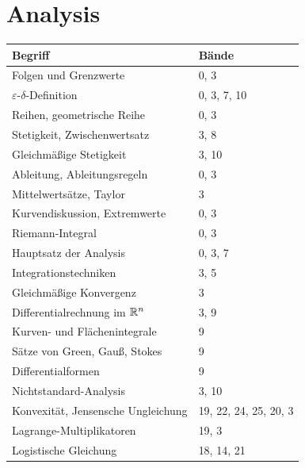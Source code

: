 \section*{Analysis}
\nopagebreak
{\small\renewcommand{\arraystretch}{1.32}
\begin{longtable}{@{}P{5.6cm}P{2.8cm}@{}}
\toprule
\textbf{Begriff} & \textbf{Bände}\\
\midrule
\endhead
Folgen und Grenzwerte & 0, 3\\
$\varepsilon$-$\delta$-Definition & 0, 3, 7, 10\\
Reihen, geometrische Reihe & 0, 3\\
Stetigkeit, Zwischenwertsatz & 3, 8\\
Gleichmäßige Stetigkeit & 3, 10\\
Ableitung, Ableitungsregeln & 0, 3\\
Mittelwertsätze, Taylor & 3\\
Kurvendiskussion, Extremwerte & 0, 3\\
Riemann-Integral & 0, 3\\
Hauptsatz der Analysis & 0, 3, 7\\
Integrationstechniken & 3, 5\\
Gleichmäßige Konvergenz & 3\\
Differentialrechnung im $\mathbb{R}^{n}$ & 3, 9\\
Kurven- und Flächenintegrale & 9\\
Sätze von Green, Gauß, Stokes & 9\\
Differentialformen & 9\\
Nichtstandard-Analysis & 3, 10\\
Konvexität, Jensensche Ungleichung & 19, 22, 24, 25, 20, 3\\
Lagrange-Multiplikatoren & 19, 3\\
Logistische Gleichung & 18, 14, 21\\
\bottomrule
\end{longtable}}

